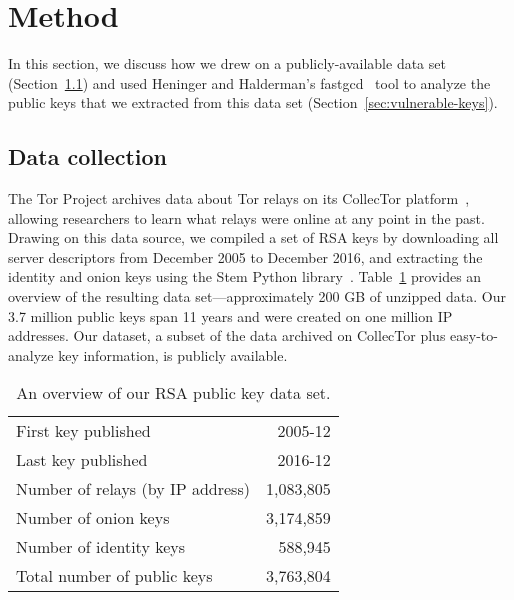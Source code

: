 \section{Method}
\label{sec:method}
In this section, we discuss how we drew on a publicly-available data set
(Section~\ref{sec:data-collection}) and used Heninger and Halderman's 
fastgcd~\cite{fastgcd} tool to analyze the public keys that 
we extracted from this data set (Section~\ref{sec:vulnerable-keys}).

\subsection{Data collection}
\label{sec:data-collection}
The Tor Project archives data about Tor relays on its CollecTor
platform~\cite{collector}, allowing researchers to learn what relays were online
at any point in the past.  Drawing on this data source, we compiled a set of RSA
keys by downloading all server descriptors from December 2005 to December 2016,
and extracting the identity and onion keys using the Stem Python
library~\cite{stem}.  Table~\ref{tab:dataset} provides an overview of the
resulting data set---approximately 200 GB of unzipped data.  Our 3.7 million
public keys span 11 years and were created on one million IP addresses.
Our dataset, a subset of the data archived on CollecTor plus
easy-to-analyze key information, is publicly available.

\begin{table}[t]
	\centering
	\begin{tabular}{l r}
	\toprule

	First key published & 2005-12 \\
	Last key published & 2016-12 \\

	\midrule

	Number of relays (by IP address) & 1,083,805 \\
	Number of onion keys & 3,174,859 \\
	Number of identity keys & 588,945 \\
	Total number of public keys & 3,763,804 \\

	\bottomrule
	\end{tabular}
	\caption{An overview of our RSA public key data set.}
	\label{tab:dataset}
\end{table}

